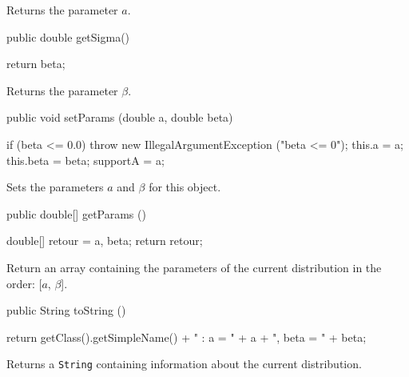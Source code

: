   \begin{tabb} Returns the parameter $a$.
  \end{tabb}
\begin{htmlonly}
\end{htmlonly}
\begin{code}

   public double getSigma()\begin{hide} {
      return beta;
   }\end{hide}
\end{code} 
  \begin{tabb} Returns the parameter $\beta$.
  \end{tabb}
\begin{htmlonly}
\end{htmlonly}
\begin{code}

   public void setParams (double a, double beta)\begin{hide} {
      if (beta <= 0.0)
        throw new IllegalArgumentException ("beta <= 0");
      this.a  = a;
      this.beta  = beta;
      supportA = a;
   }\end{hide}
\end{code} 
  \begin{tabb} Sets the parameters $a$ and $\beta$ for this object.
  \end{tabb}
\begin{htmlonly}
\end{htmlonly}
\begin{code}

   public double[] getParams ()\begin{hide} {
      double[] retour = {a, beta};
      return retour;
   }\end{hide}
\end{code}
\begin{tabb}
   Return an array containing the parameters of the current distribution
   in the order: [$a$, $\beta$].
\end{tabb}
\begin{htmlonly}
   \return{[$a$, $\beta$]}
\end{htmlonly}
\begin{hide}\begin{code}

   public String toString ()\begin{hide} {
      return getClass().getSimpleName() + " : a = " + a + ", beta = " + beta;
   }\end{hide}
\end{code}
\begin{tabb}
   Returns a \texttt{String} containing information about the current distribution.
\end{tabb}
\begin{htmlonly}
\end{htmlonly}\end{hide}
\begin{code}\begin{hide}
}\end{hide}
\end{code}

